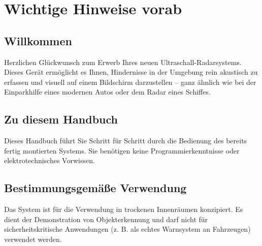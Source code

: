 %
%
%



\chapter{Wichtige Hinweise vorab}

\section{Willkommen}
Herzlichen Glückwunsch zum Erwerb Ihres neuen Ultraschall-Radarsystems. Dieses Gerät ermöglicht es Ihnen, Hindernisse in der Umgebung rein akustisch zu erfassen und visuell auf einem Bildschirm darzustellen – ganz ähnlich wie bei der Einparkhilfe eines modernen Autos oder dem Radar eines Schiffes.

\section{Zu diesem Handbuch}
Dieses Handbuch führt Sie Schritt für Schritt durch die Bedienung des bereits fertig montierten Systems. Sie benötigen keine Programmierkenntnisse oder elektrotechnisches Vorwissen. 

\section{Bestimmungsgemä\ss e Verwendung}
Das System ist für die Verwendung in trockenen Innenräumen konzipiert. Es dient der Demonstration von Objekterkennung und darf nicht für sicherheitskritische Anwendungen (z. B. als echtes Warnsystem an Fahrzeugen) verwendet werden.
